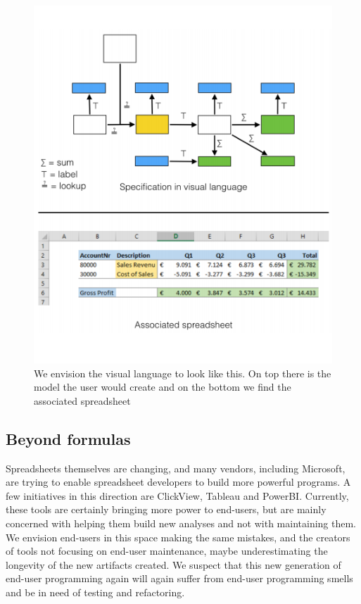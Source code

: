 \documentclass[conference]{IEEEtran}
\begin{document}
\begin{figure}
  \begin{center}
  \includegraphics[width=\columnwidth]{fig/visualLanguage.png}
  \caption{We envision the visual language to look like this. On top there is the model the user would create and on the bottom we find the associated spreadsheet}
  \label{fig:visualLanguage}
  \end{center}
\end{figure} 


\subsection{Beyond formulas}
Spreadsheets themselves are changing, and many vendors, including Microsoft, are trying to enable spreadsheet developers to build more powerful programs. A few initiatives in this direction are ClickView, Tableau and PowerBI. Currently, these tools are certainly bringing more power to end-users, but are mainly concerned with helping them build new analyses and not with maintaining them. We envision end-users in this space making the same mistakes, and the creators of tools not focusing on end-user maintenance, maybe underestimating the longevity of the new artifacts created. We suspect that this new generation of end-user programming again will again suffer from end-user programming smells and be in need of testing and refactoring.
\end{document}
